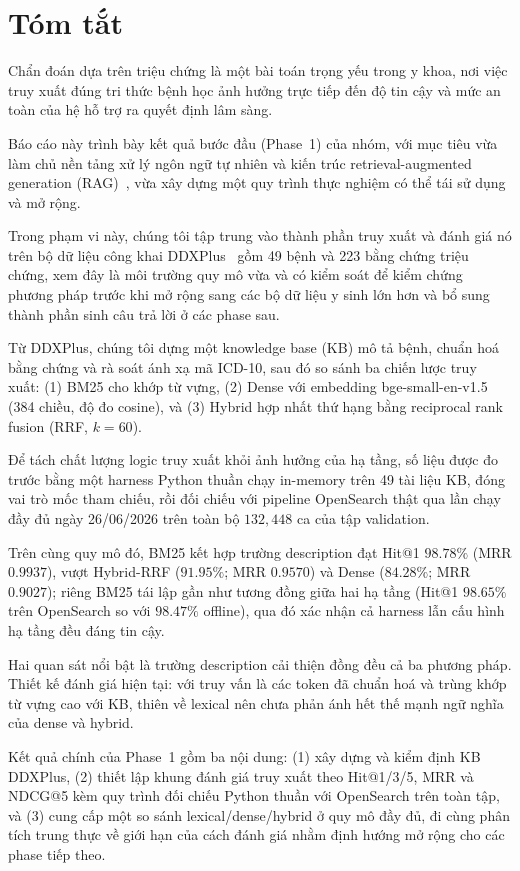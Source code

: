 
\section{Tóm tắt}
\label{sec:tomtat}

Chẩn đoán dựa trên triệu chứng là một bài toán trọng yếu trong y khoa, nơi việc truy xuất đúng tri thức bệnh học ảnh hưởng trực tiếp đến độ tin cậy và mức an toàn của hệ hỗ trợ ra quyết định lâm sàng.

Báo cáo này trình bày kết quả bước đầu (Phase~1) của nhóm, với mục tiêu vừa làm chủ nền tảng xử lý ngôn ngữ tự nhiên và kiến trúc retrieval-augmented generation (RAG)~\cite{lewis2020rag}, vừa xây dựng một quy trình thực nghiệm có thể tái sử dụng và mở rộng.

Trong phạm vi này, chúng tôi tập trung vào thành phần truy xuất và đánh giá nó trên bộ dữ liệu công khai DDXPlus~\cite{ddxplus2022} gồm 49 bệnh và 223 bằng chứng triệu chứng, xem đây là môi trường quy mô vừa và có kiểm soát để kiểm chứng phương pháp trước khi mở rộng sang các bộ dữ liệu y sinh lớn hơn và bổ sung thành phần sinh câu trả lời ở các phase sau.

Từ DDXPlus, chúng tôi dựng một knowledge base (KB) mô tả bệnh, chuẩn hoá bằng chứng và rà soát ánh xạ mã ICD-10, sau đó so sánh ba chiến lược truy xuất: (1) BM25 cho khớp từ vựng, (2) Dense với embedding bge-small-en-v1.5 (384 chiều, độ đo cosine), và (3) Hybrid hợp nhất thứ hạng bằng reciprocal rank fusion (RRF, $k = 60$).

Để tách chất lượng logic truy xuất khỏi ảnh hưởng của hạ tầng, số liệu được đo trước bằng một harness Python thuần chạy in-memory trên 49 tài liệu KB, đóng vai trò mốc tham chiếu, rồi đối chiếu với pipeline OpenSearch thật qua lần chạy đầy đủ ngày 26/06/2026 trên toàn bộ $132{,}448$ ca của tập validation.

Trên cùng quy mô đó, BM25 kết hợp trường description đạt Hit@1 $98.78\%$ (MRR $0.9937$), vượt Hybrid-RRF ($91.95\%$; MRR $0.9570$) và Dense ($84.28\%$; MRR $0.9027$); riêng BM25 tái lập gần như tương đồng giữa hai hạ tầng (Hit@1 $98.65\%$ trên OpenSearch so với $98.47\%$ offline), qua đó xác nhận cả harness lẫn cấu hình hạ tầng đều đáng tin cậy.

Hai quan sát nổi bật là trường description cải thiện đồng đều cả ba phương pháp. Thiết kế đánh giá hiện tại: với truy vấn là các token đã chuẩn hoá và trùng khớp từ vựng cao với KB, thiên về lexical nên chưa phản ánh hết thế mạnh ngữ nghĩa của dense và hybrid.

Kết quả chính của Phase~1 gồm ba nội dung: (1)  xây dựng và kiểm định KB DDXPlus, (2) thiết lập khung đánh giá truy xuất theo Hit@1/3/5, MRR và NDCG@5 kèm quy trình đối chiếu Python thuần với OpenSearch trên toàn tập, và (3) cung cấp một so sánh lexical/dense/hybrid ở quy mô đầy đủ, đi cùng phân tích trung thực về giới hạn của cách đánh giá nhằm định hướng mở rộng cho các phase tiếp theo.
